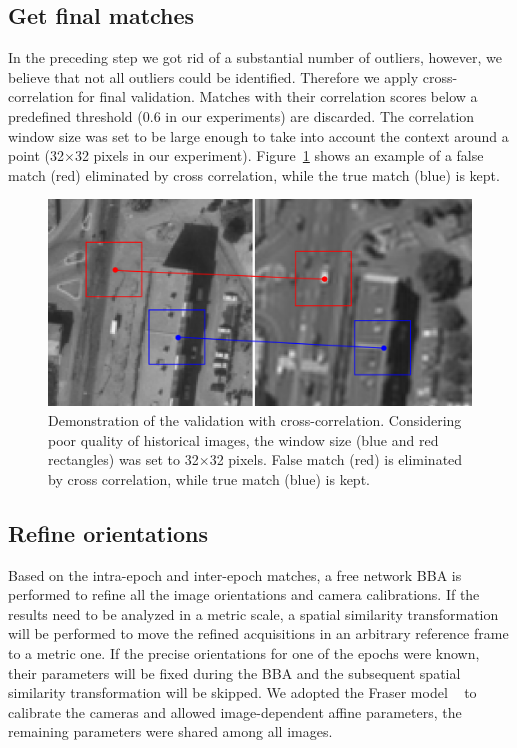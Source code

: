 \subsection{Get final matches}
In the preceding step we got rid of a substantial number of outliers, however, we believe that not all outliers could be identified. Therefore we apply cross-correlation for final validation. Matches with their correlation scores below a predefined threshold (0.6 in our experiments) are discarded. The correlation window size was set to be large enough to take into account the context around a point (32$\times$32 pixels in our experiment). Figure~\ref{crossc} shows an example of a false match (red) eliminated by cross correlation, while the true match (blue) is kept.
\begin{figure}[htbp]
	\begin{center}
		\includegraphics[width=0.8\columnwidth]{images/Chapitre4/tiept.png}
		\caption{Demonstration of the validation with cross-correlation. Considering poor quality of historical images, the window size (blue and red rectangles) was set to 32$\times$32 pixels. False match (red) is eliminated by cross correlation, while true match (blue) is kept.}
		\label{crossc}
	\end{center}
\end{figure}

\subsection{Refine orientations}
Based on the intra-epoch and inter-epoch matches, a free network \ac{BBA} is performed to refine all the image orientations and camera calibrations. If the results need to be analyzed in a metric scale, a spatial similarity transformation will be performed to move the refined acquisitions in an arbitrary reference frame to a metric one. If the precise orientations for one of the epochs were known, their parameters will be fixed during the \ac{BBA} and the subsequent spatial similarity transformation will be skipped.
We adopted the Fraser model ~\cite{fraser1997digital} to calibrate the cameras and allowed image-dependent affine parameters, the remaining parameters were shared among all images.


